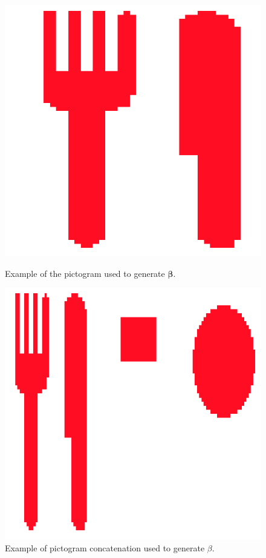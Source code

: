 \documentclass[preprint,12pt]{elsarticle}
\begin{document}
\begin{figure}[tbp]
    \centering
    \begin{minipage}{0.45\textwidth}
        \centering
        \includegraphics[scale = 0.2]{./images/fourchette.png}
        \caption{Example of the pictogram used to generate $\bm{\beta}$.}
        \label{fig:fourchette}
    \end{minipage}
    \hfill
    \begin{minipage}{0.45\textwidth}
        \centering
        \includegraphics[scale = 0.2]{./images/3_picto.png}
        \caption{Example of pictogram concatenation used to generate $\beta$.}
        \label{fig:picto_blocs}
    \end{minipage}
\end{figure}
\end{document}
